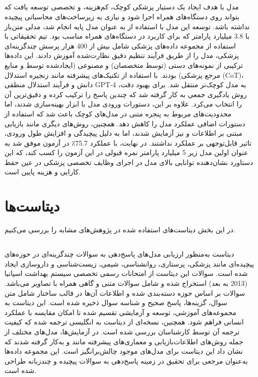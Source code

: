 \documentclass[11pt, a4paper, oneside]{book}
\begin{document}
		\section{} \label{MedMobile}
			مدل  با هدف ایجاد یک دستیار پزشکی کوچک، کم‌هزینه، و تخصصی توسعه یافت که بتواند روی دستگاه‌های همراه اجرا شود و نیازی به زیرساخت‌های محاسباتی پیچیده نداشته باشد. توسعه این مدل با استفاده از  به عنوان مدل پایه انجام شد، مدلی متن‌باز با 3.8 میلیارد پارامتر که برای کاربرد در دستگاه‌های همراه مناسب بود. تیم تحقیقاتی با استفاده از مجموعه داده‌های پزشکی  شامل بیش از 400 هزار پرسش چندگزینه‌ای پزشکی، مدل را از طریق فرآیند تنظیم دقیق نظارت‌شده آموزش دادند. این داده‌ها ترکیبی از نمونه‌های دستی (توسط متخصصان) و مصنوعی (ایجادشده توسط  و منابع مرجع پزشکی) بودند. با استفاده از تکنیک‌های پیشرفته مانند زنجیره استدلال (CoT)، دانش و فرآیند استدلال منطقی GPT-4 به مدل کوچک‌تر منتقل شد. برای بهبود دقت، روش یادگیری جمعی به کار گرفته شد که چندین پاسخ را ترکیب کرده و دقیق‌ترین آن را انتخاب می‌کرد. علاوه بر این، دستورات ورودی مدل با ابزار  بهینه‌سازی شدند، اما محدودیت‌های مربوط به پنجره متنی در مدل‌های کوچک باعث شد که استفاده از دستورات اضافی عملکرد مدل را کاهش دهد. همچنین، روش‌های دیگری مانند بازیابی مبتنی بر اطلاعات و  نیز آزمایش شدند، اما به دلیل پیچیدگی و افزایش طول ورودی، تاثیر قابل‌توجهی بر عملکرد نداشتند. در نهایت،  با عملکرد 75.7٪ در آزمون  موفق شد به عنوان اولین مدل زیر 5 میلیارد پارامتر نمره قبولی در این آزمون را کسب کند، که این دستاورد نشان‌دهنده توانایی بالای مدل در اجرای وظایف تخصصی پزشکی در عین حفظ کارایی و هزینه پایین است. \cite{vishwanath_medmobile_2024}
	

	\chapter{دیتاست‌ها}
		
		در این بخش دیتاست‌های استفاده شده در پژوهش‌های مشابه را بررسی می‌کنیم.

		\section{}
			دیتاست  به‌منظور ارزیابی مدل‌های پاسخ‌دهی به سوالات چندگزینه‌ای در حوزه‌های پیچیده‌ای مانند پزشکی، پرستاری، روانشناسی، شیمی، زیست‌شناسی و داروسازی ایجاد شده است. سوالات این دیتاست از امتحانات رسمی تخصصی سیستم بهداشت اسپانیا (2013 به بعد) استخراج شده و شامل سوالات متنی و گاهی همراه با تصاویر می‌باشد. سوالات بر اساس حوزه دسته‌بندی شده و اطلاعات آن‌ها در قالب ساختار  شامل متن سوال، گزینه‌ها، پاسخ صحیح و شناسه سوال ذخیره شده است. این دیتاست به مجموعه‌های آموزشی، توسعه و آزمایشی تقسیم شده تا امکان مقایسه با عملکرد انسانی فراهم شود. همچنین، نسخه‌ای از دیتاست به انگلیسی ترجمه شده که کیفیت ترجمه آن توسط کارشناسان بررسی شده است. در آزمایش‌ها، مدل‌های مختلف از جمله روش‌های اطلاعات‌بازیابی و معماری‌های پیشرفته مانند  و  به‌کار گرفته شدند که نشان داد این دیتاست برای مدل‌های موجود چالش‌برانگیز است. این مجموعه داده‌ها به‌عنوان مرجعی برای تحقیق در زمینه پاسخ‌دهی به سوالات پیچیده و چندزبانه طراحی شده است. \cite{vilares_head-qa_2019}
		
\end{document}
